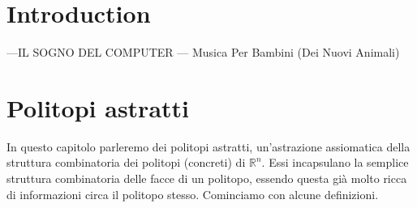 \documentclass[12pt,a4paper,twoside]{book}
\newcommand{\Rn}{\mathbb{R}^n}
\begin{document}
%

\tableofcontents %


\chapter{Introduction}
\setlength{\epigraphwidth}{.95\textwidth}
\begin{epigraphs}
{---\textsc{IL SOGNO DEL COMPUTER} --- Musica Per Bambini (Dei Nuovi Animali)}
\end{epigraphs}
\newpage
\label{ch:introduction}
%
%




\chapter{Politopi astratti}
In questo capitolo parleremo dei politopi astratti, un'astrazione assiomatica della struttura combinatoria dei politopi (concreti) di $\Rn$. Essi incapsulano la
semplice struttura combinatoria delle facce di un politopo, essendo questa gi\`a molto ricca di informazioni circa il politopo stesso. Cominciamo con alcune 
definizioni.
\end{document}
